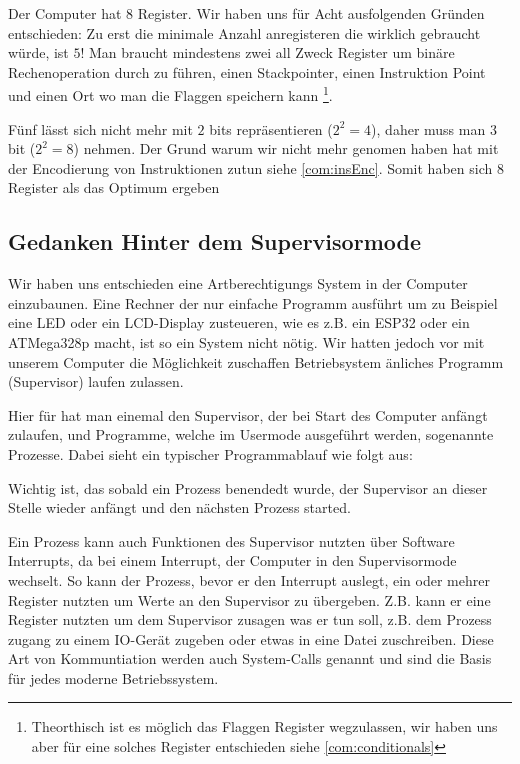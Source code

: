 \documentclass{scrartcl}
\begin{document}
Der Computer hat 8 Register. Wir haben uns für Acht ausfolgenden Gründen entschieden:
Zu erst die minimale Anzahl anregisteren die wirklich gebraucht würde, ist $5$! Man braucht mindestens zwei all Zweck Register um binäre Rechenoperation durch zu führen, einen Stackpointer, einen Instruktion Point und einen Ort wo man die Flaggen speichern kann
\footnote{Theorthisch ist es möglich das Flaggen Register wegzulassen, wir haben uns aber für eine solches Register entschieden siehe \autoref{com:conditionals}}.

Fünf lässt sich nicht mehr mit $2$ bits repräsentieren ($2^2 = 4$), daher muss man $3$ bit ($2^2 = 8$) nehmen. Der Grund warum wir nicht mehr genomen haben hat mit der Encodierung von Instruktionen zutun siehe \autoref{com:insEnc}. Somit haben sich $8$ Register als das Optimum ergeben

\subsection{\label{com:sup}Gedanken Hinter dem Supervisormode}

Wir haben uns entschieden eine Artberechtigungs System in der Computer einzubaunen. Eine Rechner der nur einfache Programm ausführt um zu Beispiel eine LED oder ein LCD-Display zusteueren, wie es z.B. ein ESP32 oder ein ATMega328p macht, ist so ein System nicht nötig. Wir hatten jedoch vor mit unserem Computer die Möglichkeit zuschaffen Betriebsystem änliches Programm (Supervisor) laufen zulassen. 

Hier für hat man einemal den Supervisor, der bei Start des Computer anfängt zulaufen, und Programme, welche im Usermode ausgeführt werden, sogenannte Prozesse. Dabei sieht ein typischer Programmablauf wie folgt aus:


Wichtig ist, das sobald ein Prozess benendedt wurde, der Supervisor an dieser Stelle wieder anfängt und den nächsten Prozess started. 

Ein Prozess kann auch Funktionen des Supervisor nutzten über Software Interrupts, da bei einem Interrupt, der Computer in den Supervisormode wechselt. So kann der Prozess, bevor er den Interrupt auslegt, ein oder mehrer Register nutzten um Werte an den Supervisor zu übergeben. Z.B. kann er eine Register nutzten um dem Supervisor zusagen was er tun soll, z.B. dem Prozess zugang zu einem IO-Gerät zugeben oder etwas in eine Datei zuschreiben. Diese Art von Kommuntiation werden auch System-Calls genannt und sind die Basis für jedes moderne Betriebssystem.
\end{document}
